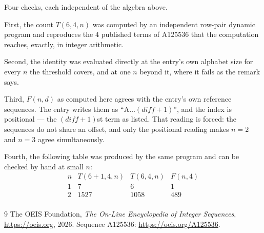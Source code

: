 \documentclass[11pt,a4paper]{article}
\theoremstyle{plain}
\theoremstyle{definition}
\begin{document}
Four checks, each independent of the algebra above.

First, the count $T(6,4,n)$ was computed by an independent row-pair dynamic program and
reproduces the $4$ published terms of A125536 that the computation reaches,
exactly, in integer arithmetic.

Second, the identity was evaluated directly at the entry's own alphabet size for every $n$ the
threshold covers, and at one $n$ beyond it, where it fails as the remark says.

Third, $F(n,d)$ as computed here agrees with the entry's own reference sequences. The entry
writes them as ``$\mathrm{A}\dots(\mathit{diff}+1)$'', and the index is positional --- the
$(\mathit{diff}+1)$st term as listed. That reading is forced: the sequences do not share an
offset, and only the positional reading makes $n=2$ and $n=3$ agree simultaneously.

Fourth, the following table was produced by the same program and can be checked by hand at
small $n$:
\[
\begin{array}{rrrr}
n & T(6+1,4,n) & T(6,4,n) & F(n,4) \\ \hline
1 & 7 & 6 & 1 \\
2 & 1527 & 1058 & 489 \\
\end{array}
\]

\begin{thebibliography}{9}
 The OEIS Foundation, \emph{The On-Line Encyclopedia of Integer Sequences},
\url{https://oeis.org}, 2026. Sequence A125536: \url{https://oeis.org/A125536}.
\end{thebibliography}
\end{document}
